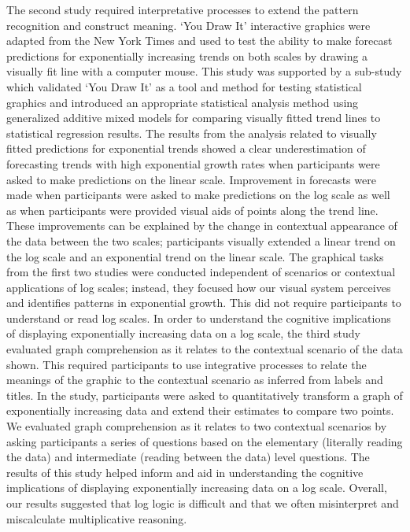 \documentclass[print]{nuthesis}
\begin{document}
The second study required interpretative processes to extend the pattern recognition and construct meaning.
`You Draw It' interactive graphics were adapted from the New York Times and used to test the ability to make forecast predictions for exponentially increasing trends on both scales by drawing a visually fit line with a computer mouse.
This study was supported by a sub-study which validated `You Draw It' as a tool and method for testing statistical graphics and introduced an appropriate statistical analysis method using generalized additive mixed models for comparing visually fitted trend lines to statistical regression results.
The results from the analysis related to visually fitted predictions for exponential trends showed a clear underestimation of forecasting trends with high exponential growth rates when participants were asked to make predictions on the linear scale.
Improvement in forecasts were made when participants were asked to make predictions on the log scale as well as when participants were provided visual aids of points along the trend line.
These improvements can be explained by the change in contextual appearance of the data between the two scales; participants visually extended a linear trend on the log scale and an exponential trend on the linear scale.
The graphical tasks from the first two studies were conducted independent of scenarios or contextual applications of log scales; instead, they focused how our visual system perceives and identifies patterns in exponential growth.
This did not require participants to understand or read log scales.
In order to understand the cognitive implications of displaying exponentially increasing data on a log scale, the third study evaluated graph comprehension as it relates to the contextual scenario of the data shown.
This required participants to use integrative processes to relate the meanings of the graphic to the contextual scenario as inferred from labels and titles.
In the study, participants were asked to quantitatively transform a graph of exponentially increasing data and extend their estimates to compare two points.
We evaluated graph comprehension as it relates to two contextual scenarios by asking participants a series of questions based on the elementary (literally reading the data) and intermediate (reading between the data) level questions.
The results of this study helped inform and aid in understanding the cognitive implications of displaying exponentially increasing data on a log scale.
Overall, our results suggested that log logic is difficult and that we often misinterpret and miscalculate multiplicative reasoning.
\end{document}
